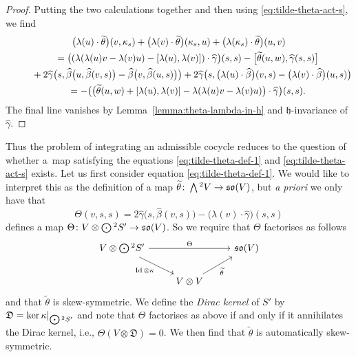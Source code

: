 \documentclass[11pt]{article}
\numberwithin{equation}{section}
\numberwithin{equation}{section}
\newcommand{\fh}{\mathfrak{h}}
\newcommand{\fso}{\mathfrak{so}}
\newcommand{\fD}{\mathfrak{D}}
\newcommand{\betahat}{\widehat{\beta}}
\newcommand{\gammahat}{\widehat{\gamma}}
\newcommand{\thetatilde}{\widetilde{\theta}}
\newcommand{\Wedge}{\mathchoice{{\textstyle\bigwedge}}{\bigwedge}{\bigwedge}{\bigwedge}}	%
\newcommand{\Odot}{\mathchoice{{\textstyle\bigodot}}{\bigodot}{\bigodot}{\bigodot}}
\newcommand{\1}{\mathbbm{1}}
\DeclareMathOperator{\Id}{Id}
\begin{document}
\begin{proof}
	Putting the two calculations together and then using \eqref{eq:tilde-theta-act-s}, we find
	\begin{gather*}%
		\bigl(\lambda(u)\cdot\thetatilde\bigr)(v,\kappa_s) + \bigl(\lambda(v)\cdot\thetatilde\bigr)(\kappa_s,u) + \bigl(\lambda(\kappa_s)\cdot\thetatilde\bigr)(u,v)\\
		\qquad = \bigl((\lambda(\lambda(u)v-\lambda(v)u) - \comm{\lambda(u)}{\lambda(v)})\cdot\gammahat\bigr)(s,s)
		-\big[\thetatilde(u,w),\gammahat(s,s)\big] \\
		\phantom{\qquad =}{} + 2\gammahat\bigl(s,\betahat\bigl(u,\betahat(v,s)\bigr)-\betahat\bigl(v,\betahat(u,s)\bigr)\bigr)+ 2\gammahat\bigl(s,\bigl(\lambda(u)\cdot\betahat\bigr)(v,s) - \bigl(\lambda(v)\cdot\betahat\bigr)(u,s)\bigr)\\
		\qquad= -\bigl(\bigl(\thetatilde(u,w) + \comm{\lambda(u)}{\lambda(v)} - \lambda(\lambda(u)v-\lambda(v)u)\bigr)\cdot\gammahat\bigr)(s,s).
	\end{gather*}
	The final line vanishes by Lemma~\ref{lemma:theta-lambda-in-h} and $\fh$-invariance of $\gammahat$.
\end{proof}

Thus the problem of integrating an admissible cocycle reduces to the question of whether a~map satisfying the equations \eqref{eq:tilde-theta-def-1} and \eqref{eq:tilde-theta-act-s} exists. Let us first consider equation \eqref{eq:tilde-theta-def-1}. We would like to interpret this as the definition of a map $\thetatilde\colon \Wedge^2V\to \fso(V)$, but \textit{a priori} we only have that
\begin{equation}\label{eq:Theta-def}
	\Theta(v,s,s) = 2\gammahat\bigl(s,\betahat(v,s)\bigr) - \bigl(\lambda(v)\cdot\gammahat\bigr)(s,s)
\end{equation}
defines a map $\Theta\colon V\otimes \Odot^2 S' \to \fso(V)$. So we require  that $\Theta$ factorises as follows
\[%
\begin{tikzcd}
	V\otimes \Odot^2 S' \ar[rr,"\Theta"]\ar[rd,"\Id\otimes \kappa"'] & & \fso(V)\\
		& V \otimes V \ar[ru,"\thetatilde"'] &
\end{tikzcd}
\]
and that $\thetatilde$ is skew-symmetric. We define the \emph{Dirac kernel} of $S'$ by $\fD=\ker\kappa|_{\Odot^2S'}$ and note that $\Theta$ factorises as above if and only if it annihilates the Dirac kernel, i.e., $\Theta(V\otimes\fD)=0$. We then find that $\thetatilde$ is automatically skew-symmetric.
\end{document}
